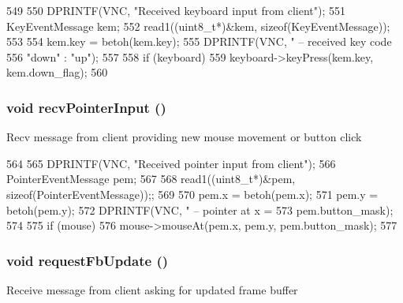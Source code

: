 \begin{DoxyCode}
549 {
550     DPRINTF(VNC, "Received keyboard input from client\n");
551     KeyEventMessage kem;
552     read1((uint8_t*)&kem, sizeof(KeyEventMessage));
553 
554     kem.key = betoh(kem.key);
555     DPRINTF(VNC, " -- received key code %
556             "down" : "up");
557 
558     if (keyboard)
559         keyboard->keyPress(kem.key, kem.down_flag);
560 }
\end{DoxyCode}
\hypertarget{classVncServer_a95d4cde3a9b92bbac5871d8b475eedd3}{
\subsubsection[{recvPointerInput}]{\setlength{\rightskip}{0pt plus 5cm}void recvPointerInput ()}}
\label{classVncServer_a95d4cde3a9b92bbac5871d8b475eedd3}
Recv message from client providing new mouse movement or button click 


\begin{DoxyCode}
564 {
565     DPRINTF(VNC, "Received pointer input from client\n");
566     PointerEventMessage pem;
567 
568     read1((uint8_t*)&pem, sizeof(PointerEventMessage));;
569 
570     pem.x = betoh(pem.x);
571     pem.y = betoh(pem.y);
572     DPRINTF(VNC, " -- pointer at x = %
573             pem.button_mask);
574 
575     if (mouse)
576         mouse->mouseAt(pem.x, pem.y, pem.button_mask);
577 }
\end{DoxyCode}
\hypertarget{classVncServer_a83f5ce82a666e5b948e2a14b430633ce}{
\subsubsection[{requestFbUpdate}]{\setlength{\rightskip}{0pt plus 5cm}void requestFbUpdate ()}}
\label{classVncServer_a83f5ce82a666e5b948e2a14b430633ce}
Receive message from client asking for updated frame buffer 


